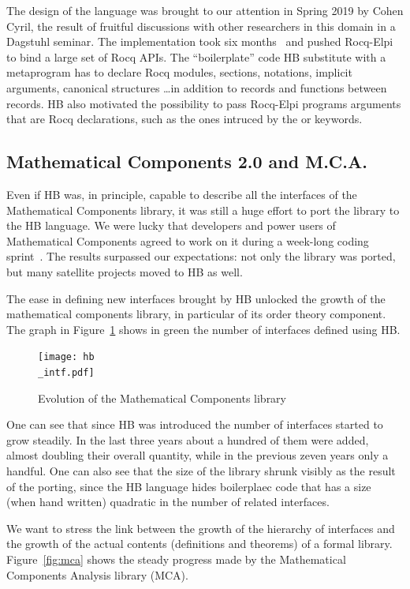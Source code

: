 \documentclass[a4paper, 11pt]{book}
\begin{document}
The design of the language was brought to our attention in Spring 2019
by Cohen Cyril, the result of fruitful discussions with other
researchers in this domain in a Dagstuhl seminar. The implementation
took six months~\cite{cohen_et_al:LIPIcs.FSCD.2020.34} and pushed
Rocq-Elpi to bind a large set of Rocq APIs. The ``boilerplate'' code
HB substitute with a metaprogram has to declare Rocq modules, sections,
notations, implicit arguments, canonical structures \ldots in addition
to records and functions between records. HB also motivated the possibility
to pass Rocq-Elpi programs arguments that are Rocq declarations, such as the ones intruced by
the  or  keywords.


\subsection{Mathematical Components 2.0 and M.C.A.}

Even if HB was, in principle, capable to describe all the interfaces of
the Mathematical Components library, it was still a huge effort to port the
library to the HB language.  We were lucky that developers and power users of
Mathematical Components agreed to work on it during a week-long coding
sprint~\cite{affeldt:hal-03463762}. The results surpassed our expectations:
not only the library was ported, but many satellite projects moved to
HB as well.

The ease in defining new interfaces brought by HB unlocked 
the growth of the mathematical components library, in particular of
its order theory component. The graph in Figure~\ref{fig:mc} shows in green the
number of interfaces defined using HB.

\begin{figure}[!ht]
\texttt{[image: hb\\\_intf.pdf]}
\caption{Evolution of the Mathematical Components library\label{fig:mc}}
\end{figure}

One can see that since HB was introduced the number of
interfaces started to grow steadily. In the last three years about a hundred
of them were added, almost doubling their overall quantity,
while in the previous zeven years only a handful.
One can also see that the size of the library shrunk visibly as the result of
the porting, since the HB language hides boilerplaec code that has a size
(when hand written) quadratic in the number of related interfaces.

We want to stress the link between the growth of the hierarchy of interfaces and
the growth of the actual contents (definitions and theorems) of a formal
library. Figure~\ref{fig:mca} shows the steady progress made by the
Mathematical Components Analysis library (MCA).
\end{document}
